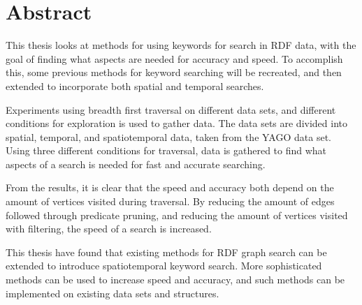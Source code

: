 \section*{Abstract}
This thesis looks at methods for using keywords for search in RDF data, with the goal of finding what aspects are needed for accuracy and speed. To accomplish this, some previous methods for keyword searching will be recreated, and then extended to incorporate both spatial and temporal searches. 

Experiments using breadth first traversal on different data sets, and different conditions for exploration is used to gather data. The data sets are divided into spatial, temporal, and spatiotemporal data, taken from the YAGO data set. Using three different conditions for traversal, data is gathered to find what aspects of a search is needed for fast and accurate searching.

From the results, it is clear that the speed and accuracy both depend on the amount of vertices visited during traversal. By reducing the amount of edges followed through predicate pruning, and reducing the amount of vertices visited with filtering, the speed of a search is increased.

This thesis have found that existing methods for RDF graph search can be extended to introduce spatiotemporal keyword search. More sophisticated methods can be used to increase speed and accuracy, and such methods can be implemented on existing data sets and structures.
